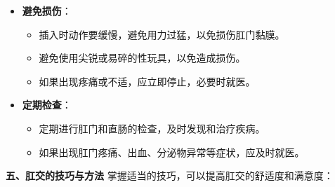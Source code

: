 \documentclass[12pt,UTF8]{ctexbook}
\begin{document}
\begin{itemize}
\begin{itemize}
	\end{itemize}
	\item \textbf{避免损伤}：
	\begin{itemize}
		\item 插入时动作要缓慢，避免用力过猛，以免损伤肛门黏膜。
		\item 避免使用尖锐或易碎的性玩具，以免造成损伤。
		\item 如果出现疼痛或不适，应立即停止，必要时就医。
	\end{itemize}
	\item \textbf{定期检查}：
	\begin{itemize}
		\item 定期进行肛门和直肠的检查，及时发现和治疗疾病。
		\item 如果出现肛门疼痛、出血、分泌物异常等症状，应及时就医。
	\end{itemize}
\end{itemize}

\textbf{五、肛交的技巧与方法}
掌握适当的技巧，可以提高肛交的舒适度和满意度：
\end{document}
